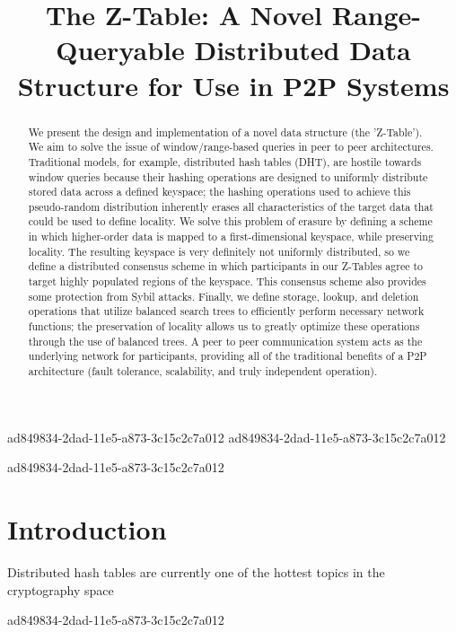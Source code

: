 \documentclass[12pt]{article}
\title{The Z-Table: A Novel Range-Queryable Distributed Data Structure for Use in P2P Systems}
\begin{document}
ad849834-2dad-11e5-a873-3c15c2c7a012
ad849834-2dad-11e5-a873-3c15c2c7a012\maketitle

\begin{abstract}
We present the design and implementation of a novel data structure (the 'Z-Table'). We aim to solve the issue of window/range-based queries in peer to peer architectures. Traditional models, for example,  distributed hash tables (DHT), are hostile towards window queries because their hashing operations are designed to uniformly distribute stored data across a defined keyspace; the hashing operations used to achieve this pseudo-random distribution inherently erases all characteristics of the target data that could be used to define locality. We solve this problem of erasure by defining a scheme in which higher-order data is mapped to a first-dimensional keyspace, while preserving locality. The resulting keyspace is very definitely not uniformly distributed, so we define a distributed consensus scheme in which participants in our Z-Tables agree to target highly populated regions of the keyspace. This consensus scheme also provides some protection from Sybil attacks. Finally, we define storage, lookup, and deletion operations that utilize balanced search trees to efficiently perform necessary network functions; the preservation of locality allows us to greatly optimize these operations through the use of balanced trees. A peer to peer communication system acts as the underlying network for participants, providing all of the traditional benefits of a P2P architecture (fault tolerance, scalability, and truly independent operation).
\end{abstract}

ad849834-2dad-11e5-a873-3c15c2c7a012
\newpage
\section{Introduction}
Distributed hash tables are currently one of the hottest topics in the cryptography space~\cite{Stoica:2001dj,Rowstron:2001ea,Ratnasamy:2001wn}

\printbibliography
ad849834-2dad-11e5-a873-3c15c2c7a012
\end{document}
